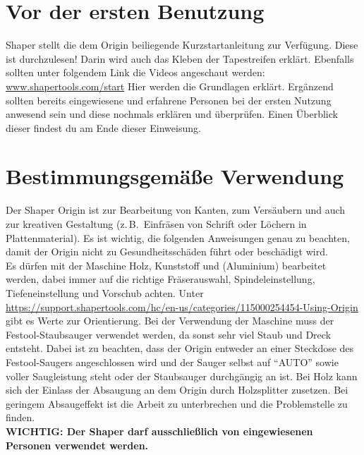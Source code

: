 \documentclass{\basedir/fablab-document}
\begin{document}


\section{Vor der ersten Benutzung}
Shaper stellt die dem Origin beiliegende Kurzstartanleitung zur Verfügung.
Diese ist durchzulesen! Darin wird auch das Kleben der Tapestreifen erklärt.
Ebenfalls sollten unter folgendem Link die Videos angeschaut werden:
\url{www.shapertools.com/start} Hier werden die Grundlagen erklärt.
Ergänzend sollten bereits eingewiesene und erfahrene Personen bei der ersten
Nutzung anwesend sein und diese nochmals erklären und überprüfen.
Einen Überblick dieser findest du am Ende dieser Einweisung.

\section{Bestimmungsgemäße Verwendung}
Der Shaper Origin ist zur Bearbeitung von Kanten, zum Versäubern und auch
zur kreativen Gestaltung (z.\,B.\ Einfräsen von Schrift oder Löchern in
Plattenmaterial). Es ist wichtig, die folgenden Anweisungen genau zu
beachten, damit der Origin nicht zu Gesundheitsschäden führt oder
beschädigt wird.\\
Es dürfen mit der Maschine Holz, Kunststoff und (Aluminium) bearbeitet
werden, dabei immer auf die richtige Fräserauswahl, Spindeleinstellung,
Tiefeneinstellung und Vorschub achten. Unter
\url{https://support.shapertools.com/hc/en-us/categories/115000254454-Using-Origin}
gibt es Werte zur Orientierung. Bei der Verwendung der Maschine
muss der Festool-Staubsauger verwendet werden, da sonst sehr viel
Staub und Dreck entsteht. Dabei ist zu beachten, dass der Origin entweder
an einer Steckdose des Festool-Saugers angeschlossen wird und der Sauger
selbst auf \enquote{AUTO} sowie voller Saugleistung steht oder der
Staubsauger durchgängig an ist. Bei Holz kann sich der Einlass der Absaugung
an dem Origin durch Holzsplitter zusetzen. Bei geringem Absaugeffekt ist
die Arbeit zu unterbrechen und die Problemstelle zu finden.\\
\textbf{WICHTIG: Der Shaper darf ausschließlich von eingewiesenen Personen verwendet werden.}
\end{document}

